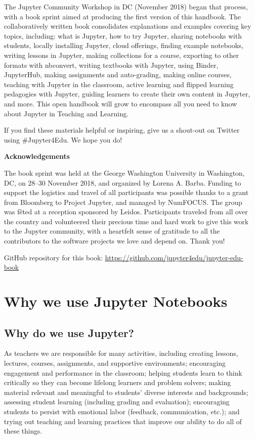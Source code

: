 \documentclass[]{book}
\begin{document}
The Jupyter Community Workshop in DC (November 2018) began that process,
with a book sprint aimed at producing the first version of this
handbook. The collaboratively written book consolidates explanations and
examples covering key topics, including: what is Jupyter, how to try
Jupyter, sharing notebooks with students, locally installing Jupyter,
cloud offerings, finding example notebooks, writing lessons in Jupyter,
making collections for a course, exporting to other formats with
nbconvert, writing textbooks with Jupyter, using Binder, JupyterHub,
making assignments and auto-grading, making online courses, teaching
with Jupyter in the classroom, active learning and flipped learning
pedagogies with Jupyter, guiding learners to create their own content in
Jupyter, and more. This open handbook will grow to encompass all you
need to know about Jupyter in Teaching and Learning.

If you find these materials helpful or inspiring, give us a shout-out on
Twitter using \#Jupyter4Edu. We hope you do!

\textbf{Acknowledgements}

The book sprint was held at the George Washington University in
Washington, DC, on 28--30 November 2018, and organized by Lorena A.
Barba. Funding to support the logistics and travel of all participants
was possible thanks to a grant from Bloomberg to Project Jupyter, and
managed by NumFOCUS. The group was fêted at a reception sponsored by
Leidos. Participants traveled from all over the country and volunteered
their precious time and hard work to give this work to the Jupyter
community, with a heartfelt sense of gratitude to all the contributors
to the software projects we love and depend on. Thank you!

GitHub repository for this book:
\url{https://github.com/jupyter4edu/jupyter-edu-book}

\chapter{Why we use Jupyter
Notebooks}\label{why-we-use-jupyter-notebooks}

\section{Why do we use Jupyter?}\label{why-do-we-use-jupyter}

As teachers we are responsible for many activities, including creating
lessons, lectures, courses, assignments, and supportive environments;
encouraging engagement and performance in the classroom; helping
students learn to think critically so they can become lifelong learners
and problem solvers; making material relevant and meaningful to
students' diverse interests and backgrounds; assessing student learning
(including grading and evaluation); encouraging students to persist with
emotional labor (feedback, communication, etc.); and trying out teaching
and learning practices that improve our ability to do all of these
things.
\end{document}
